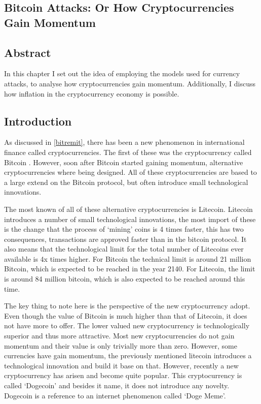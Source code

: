 \begin{refsection}
\chapter{Bitcoin Attacks: Or How Cryptocurrencies Gain Momentum}
\label{bitatt}
\section*{Abstract}
In this chapter I set out the idea of employing the models used for currency attacks,
to analyse how cryptocurrencies gain momentum.
Additionally, I discuss how inflation in the cryptocurrency economy is possible.
\pagebreak

\section{Introduction}
As discussed in \autoref{bitremit}, there has been a new phenomenon in international finance called cryptocurrencies.
The first of these was the cryptocurrency called Bitcoin \parencite{nakamoto2008bitcoin}.
However, soon after Bitcoin started gaining momentum, alternative cryptocurrencies where being designed.
All of these cryptocurrencies are based to a large extend on the Bitcoin protocol,
but often introduce small technological innovations.

The most known of all of these alternative cryptocurrencies is Litecoin. Litecoin introduces a number of small technological innovations,
the most import of these is the change that the process of `mining' coins is 4 times faster,
this has two consequences, transactions are approved faster than in the bitcoin protocol.
It also means that the technological limit for the total number of Litecoins ever available is 4x times higher.
For Bitcoin the technical limit is around 21 million Bitcoin, which is expected to be reached in the year 2140.
For Litecoin, the limit is around 84 million bitcoin, which is also expected to be reached around this time.

The key thing to note here is the perspective of the new cryptocurrency adopt.
Even though the value of Bitcoin is much higher than that of Litecoin, it does not have more to offer.
The lower valued new cryptocurrency is technologically superior and thus more attractive.
Most new cryptocurrencies do not gain momentum and their value is only trivially more than zero.
However, some currencies have gain momentum,
the previously mentioned litecoin introduces a technological innovation and build it base on that.
However, recently a new cryptocurrency has arisen and become quite popular.
This cryptocurrency is called `Dogecoin' and besides it name, it does not introduce any novelty.
Dogecoin is a reference to an internet phenomenon called `Doge Meme'.


\end{refsection}
